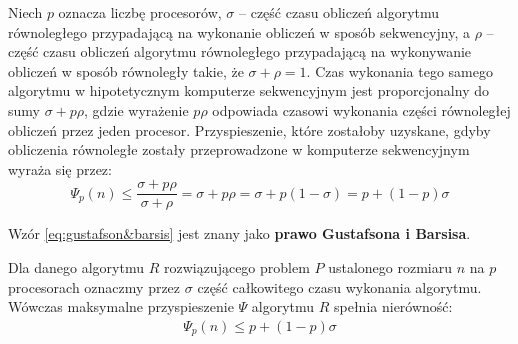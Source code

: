 Niech \(p\) oznacza liczbę procesorów, \(\sigma\) -- część czasu obliczeń algorytmu równoległego przypadającą na wykonanie obliczeń w sposób sekwencyjny, a \(\rho\) -- część czasu obliczeń algorytmu równoległego przypadającą na wykonywanie obliczeń w sposób równoległy takie, że \(\sigma+\rho=1\). Czas wykonania tego samego algorytmu w hipotetycznym komputerze sekwencyjnym jest proporcjonalny do sumy \(\sigma + p\rho\), gdzie wyrażenie \(p\rho\) odpowiada czasowi wykonania części równoległej obliczeń przez jeden procesor. Przyspieszenie, które zostałoby uzyskane, gdyby obliczenia równoległe zostały przeprowadzone w komputerze sekwencyjnym wyraża się przez:
\begin{equation}\label{eq:gustafson&barsis}
\Psi_{p}(n)\leq\frac{\sigma+p\rho}{\sigma+\rho}=\sigma+p\rho=\sigma+p\left(1-\sigma\right)=p+\left(1-p\right)\sigma
\end{equation}

Wzór \eqref{eq:gustafson&barsis} jest znany jako \textbf{prawo Gustafsona i	Barsisa}. 

\begin{definicja}
Dla danego algorytmu \(R\) rozwiązującego problem \(P\) ustalonego rozmiaru \(n\) na \(p\) procesorach oznaczmy przez \(\sigma\) część całkowitego czasu wykonania algorytmu. Wówczas maksymalne przyspieszenie \(\Psi\) algorytmu \(R\) spełnia nierówność:
\begin{align*}
\Psi_{p}(n) \leq p + (1-p)\sigma
\end{align*}
\end{definicja}

